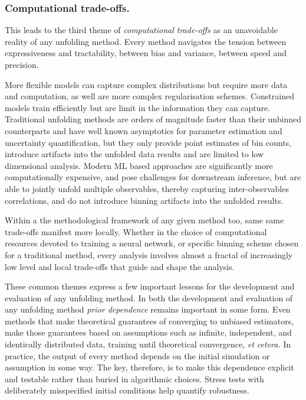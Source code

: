         \subsubsection{Computational trade-offs.}
        
        This leads to the third theme of \emph{computational trade-offs} as an unavoidable reality of any unfolding method.
        Every method navigates the tension between expressiveness and tractability, between bias and variance, between speed and precision.
        
        More flexible models can capture complex distributions but require more data and computation, as well are more complex regularisation schemes.
        Constrained models train efficiently but are limit in the information they can capture.
        Traditional unfolding methods are orders of magnitude faster than their unbinned counterparts and have well known asymptotics for parameter estimation and uncertainty quantification, but they only provide point estimates of bin counts, introduce artifacts into the unfolded data results and are limited to low dimensional analysis.
        Modern ML based approaches are significantly more computationally expensive, and pose challenges for downstream inference, but are able to jointly unfold multiple observables, thereby capturing inter-observables correlations, and do not introduce binning artifacts into the unfolded results.

        Within a the methodological framework of any given method too, same same trade-offs manifest more locally. Whether in the choice of computational resources devoted to training a neural network, or specific binning scheme chosen for a traditional method, every analysis involves almost a fractal of increasingly low level and local trade-offs that guide and shape the analysis.

    These common themes express a few important lessons for the development and evaluation of any unfolding method.
    In both the development and evaluation of any unfolding method \emph{prior dependence} remains important in some form.
    Even methods that make theoretical guarantees of converging to unbiased estimators, make those guarantees based on assumptions such as infinite, independent, and identically distributed data, training until theoretical convergence, \textit{et cetera.}
    In practice, the output of every method depends on the initial simulation or assumption in some way.
    The key, therefore, is to make this dependence explicit and testable rather than buried in algorithmic choices. Stress tests with deliberately misspecified initial conditions help quantify robustness.
    
